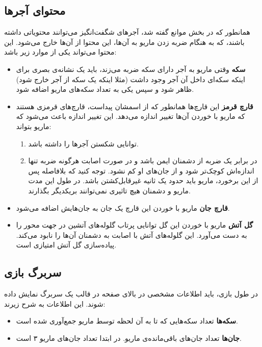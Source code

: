\documentclass{utap}
\begin{document}
	\subsection{محتوای آجرها}
همانطور که در بخش موانع گفته شد، آجر‌های شگفت‌انگیز می‌توانند محتویاتی داشته باشند، که به هنگام ضربه زدن ماریو به آن‌ها، این محتوا از آن‌ها خارج می‌شود. این محتوا می‌تواند یکی از موارد زیر باشد:
	\begin{itemize}
		\item
\textbf{سکه}
وقتی ماریو به آجر دارای سکه ضربه می‌زند، باید یک نشانه‌ی بصری برای اینکه سکه‌ای داخل آن آجر وجود داشت (مثلا اینکه یک سکه از آجر خارج شود) ظاهر شود و سپس یکی به تعداد سکه‌های ماریو اضافه شود.
		\item
\textbf{قارچ قرمز}
این قارچ‌ها همانطور که از اسمشان پیداست، قارچ‌های قرمزی هستند که ماریو با خوردن آن‌ها تغییر اندازه می‌دهد. این تغییر اندازه باعث می‌شود که ماریو بتواند:
		\begin{enumerate}
			\item
توانایی شکستن آجر‌ها را داشته باشد.
			\item
در برابر یک ضربه از دشمنان ایمن باشد و در صورت اصابت هرگونه ضربه تنها اندازه‌اش کوچک‌تر شود و از جان‌های او کم نشود. توجه کنید که بلافاصله پس از این برخورد، ماریو باید حدود یک ثانیه غیرقابل‌کشتن باشد. در طول این مدت ماریو و دشمنان هیچ تاثیری نمی‌توانند بر‌یکدیگر بگذارند.
		\end{enumerate}

		\item
\textbf{قارچ جان}
ماریو با خوردن این قارچ یک جان به جان‌هایش اضافه می‌شود.
		\item
\textbf{گل آتش}
ماریو با خوردن این گل توانایی پرتاب گلوله‌های آتشین در جهت محور  را به دست می‌آورد. این گلوله‌های آتش با اصابت به دشمنان آن‌ها را نابود می‌کند. پیاده‌سازی گل آتش امتیازی است.
	\end{itemize}

	\subsection{سربرگ‌ بازی}
در طول بازی، باید اطلاعات مشخصی در بالای صفحه در قالب یک سربرگ نمایش داده شوند. این اطلاعات به شرح زیرند:
	\begin{itemize}
		\item
\textbf{سکه‌ها}
تعداد سکه‌هایی که تا به آن لحظه توسط ماریو جمع‌آوری شده است.
		\item
\textbf{جان‌ها}
تعداد جان‌های باقی‌مانده‌ی ماریو. در ابتدا تعداد جان‌های ماریو  ۳ است.
	\end{itemize}
\end{document}
